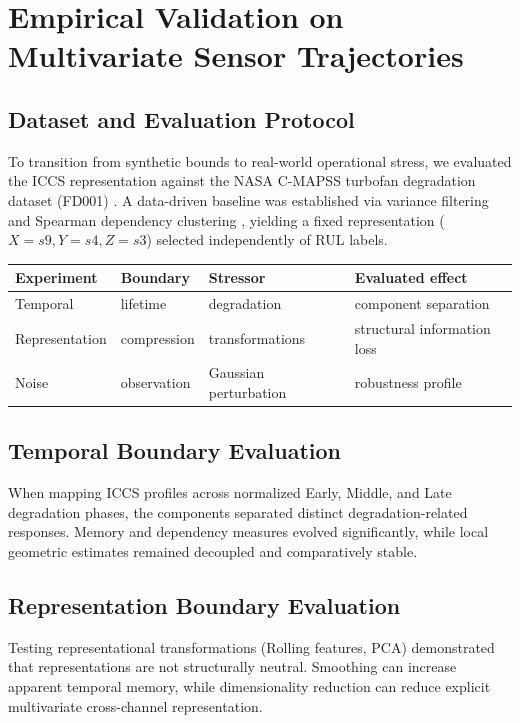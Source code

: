 \documentclass[11pt,a4paper]{article}
\begin{document}
\section{Empirical Validation on Multivariate Sensor Trajectories}

\subsection{Dataset and Evaluation Protocol}
To transition from synthetic bounds to real-world operational stress, we evaluated the ICCS representation against the NASA C-MAPSS turbofan degradation dataset (FD001) \cite{Saxena2008}. A data-driven baseline was established via variance filtering and Spearman dependency clustering \cite{Spearman1904}, yielding a fixed representation ($X=s9, Y=s4, Z=s3$) selected independently of RUL labels.

\begin{table}[h]
\centering
\begin{tabular}{llll}
\toprule
\textbf{Experiment} & \textbf{Boundary} & \textbf{Stressor} & \textbf{Evaluated effect} \\
\midrule
Temporal & lifetime & degradation & component separation \\
Representation & compression & transformations & structural information loss \\
Noise & observation & Gaussian perturbation & robustness profile \\
\bottomrule
\end{tabular}
\end{table}

\subsection{Temporal Boundary Evaluation}
When mapping ICCS profiles across normalized Early, Middle, and Late degradation phases, the components separated distinct degradation-related responses. Memory and dependency measures evolved significantly, while local geometric estimates remained decoupled and comparatively stable.

\subsection{Representation Boundary Evaluation}
Testing representational transformations (Rolling features, PCA) demonstrated that representations are not structurally neutral. Smoothing can increase apparent temporal memory, while dimensionality reduction can reduce explicit multivariate cross-channel representation.
\end{document}
